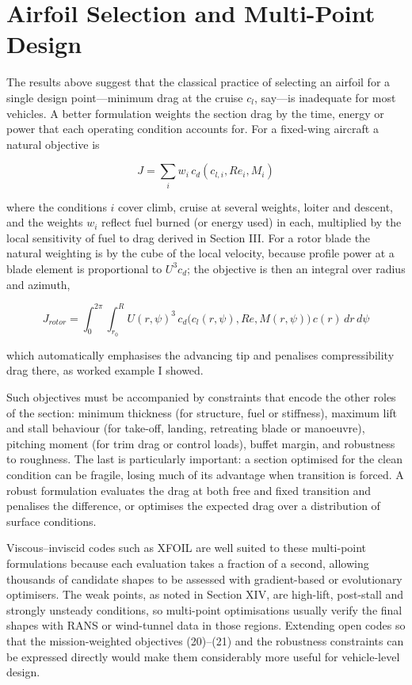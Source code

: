 \documentclass[10pt,a4paper,twocolumn]{article}
\begin{document}
\hypertarget{airfoil-selection-and-multi-point-design}{%
\section{Airfoil Selection and Multi-Point
Design}\label{airfoil-selection-and-multi-point-design}}

The results above suggest that the classical practice of selecting an
airfoil for a single design point---minimum drag at the cruise \(c_l\),
say---is inadequate for most vehicles. A better formulation weights the
section drag by the time, energy or power that each operating condition
accounts for. For a fixed-wing aircraft a natural objective is

\[J = \sum_i w_i\, c_d(c_{l,i}, Re_i, M_i) \tag{20}\]

where the conditions \(i\) cover climb, cruise at several weights,
loiter and descent, and the weights \(w_i\) reflect fuel burned (or
energy used) in each, multiplied by the local sensitivity of fuel to
drag derived in Section III. For a rotor blade the natural weighting is
by the cube of the local velocity, because profile power at a blade
element is proportional to \(U^3 c_d\); the objective is then an
integral over radius and azimuth,

\[J_{rotor} = \int_0^{2\pi}\!\!\int_{r_0}^{R} U(r,\psi)^3\, c_d\big(c_l(r,\psi), Re, M(r,\psi)\big)\, c(r)\,dr\,d\psi \tag{21}\]

which automatically emphasises the advancing tip and penalises
compressibility drag there, as worked example I showed.

Such objectives must be accompanied by constraints that encode the other
roles of the section: minimum thickness (for structure, fuel or
stiffness), maximum lift and stall behaviour (for take-off, landing,
retreating blade or manoeuvre), pitching moment (for trim drag or
control loads), buffet margin, and robustness to roughness. The last is
particularly important: a section optimised for the clean condition can
be fragile, losing much of its advantage when transition is forced. A
robust formulation evaluates the drag at both free and fixed transition
and penalises the difference, or optimises the expected drag over a
distribution of surface conditions.

Viscous--inviscid codes such as XFOIL are well suited to these
multi-point formulations because each evaluation takes a fraction of a
second, allowing thousands of candidate shapes to be assessed with
gradient-based or evolutionary optimisers. The weak points, as noted in
Section XIV, are high-lift, post-stall and strongly unsteady conditions,
so multi-point optimisations usually verify the final shapes with RANS
or wind-tunnel data in those regions. Extending open codes so that the
mission-weighted objectives (20)--(21) and the robustness constraints
can be expressed directly would make them considerably more useful for
vehicle-level design.
\end{document}
